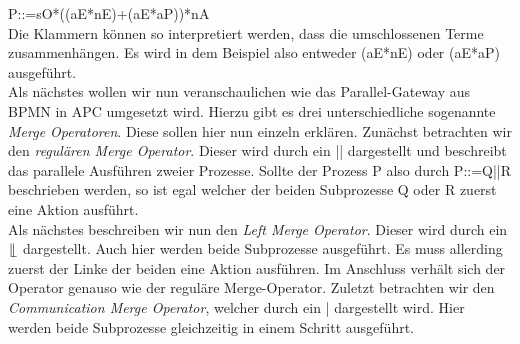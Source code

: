 P::=sO*((aE*nE)+(aE*aP))*nA\\
Die Klammern können so interpretiert werden, dass die umschlossenen Terme zusammenhängen. Es wird in dem Beispiel also entweder (aE*nE) oder (aE*aP) ausgeführt.\\
Als nächstes wollen wir nun veranschaulichen wie das Parallel-Gateway aus BPMN in APC umgesetzt wird. Hierzu gibt es drei unterschiedliche sogenannte \textit{Merge Operatoren}. Diese sollen hier nun einzeln erklären.
Zunächst betrachten wir den \textit{regulären Merge Operator}. Dieser wird durch ein || dargestellt und beschreibt das parallele Ausführen zweier Prozesse. Sollte der Prozess P also durch P::=Q||R beschrieben werden, so ist egal welcher der beiden Subprozesse Q oder R zuerst eine Aktion ausführt.\\
Als nächstes beschreiben wir nun den \textit{Left Merge Operator}. Dieser wird durch ein $\lfloor \hspace{-0.25em} \lfloor$ dargestellt. Auch hier werden beide Subprozesse ausgeführt. Es muss allerding zuerst der Linke der beiden eine Aktion ausführen. Im Anschluss verhält sich der Operator genauso wie der reguläre Merge-Operator. Zuletzt betrachten wir den \textit{Communication Merge Operator}, welcher durch ein | dargestellt wird. Hier werden beide Subprozesse gleichzeitig in einem Schritt ausgeführt.
